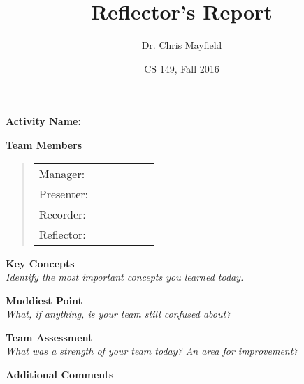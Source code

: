 \documentclass[12pt]{article}
\title{Reflector's Report}
\author{Dr. Chris Mayfield}
\date{CS 149, Fall 2016}
\begin{document}
\maketitle
\vspace{1ex}

\textbf{Activity Name:}
\vspace{1em}

\textbf{Team Members}
\vspace{-1ex}
\begin{quote}
\renewcommand{\arraystretch}{1.6}
\begin{tabular}{l@{~}p{0.5\linewidth}}
Manager:   & \hrulefill \\
Presenter: & \hrulefill \\
Recorder:  & \hrulefill \\
Reflector: & \hrulefill \\
\end{tabular}
\end{quote}
\vspace{1ex}

\textbf{Key Concepts} \\
\textit{Identify the most important concepts you learned today.}
\vspace{12em}

\textbf{Muddiest Point} \\
\textit{What, if anything, is your team still confused about?}
\vspace{8em}

\textbf{Team Assessment} \\
\textit{What was a strength of your team today? An area for improvement?}
\vspace{8em}

\textbf{Additional Comments}
\vspace{4em}
\end{document}
